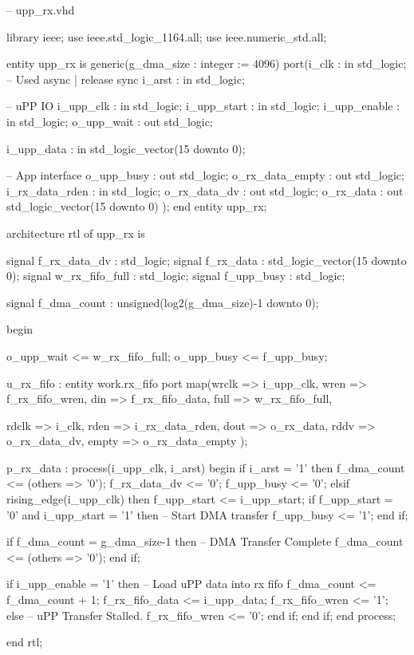 \begin{VHDLlisting}[tabsize=4]
-- upp_rx.vhd

library ieee;
	use ieee.std_logic_1164.all;
	use ieee.numeric_std.all;
	
entity upp_rx is
	generic(g_dma_size : integer := 4096)
	port(i_clk           : in    std_logic;
		 -- Used async | release sync
	     i_arst          : in    std_logic;
		 
		 -- uPP IO
		 i_upp_clk       : in    std_logic; 
		 i_upp_start     : in    std_logic;
		 i_upp_enable    : in    std_logic;
		 o_upp_wait      :   out std_logic;
		 
		 i_upp_data      : in    std_logic_vector(15 downto 0);
		 
		 -- App interface
		 o_upp_busy      :   out std_logic;
		 o_rx_data_empty :   out std_logic;
		 i_rx_data_rden  : in    std_logic;
		 o_rx_data_dv    :   out std_logic;
		 o_rx_data       :   out std_logic_vector(15 downto 0)	
	);
end entity upp_rx;


architecture rtl of upp_rx is
	
	signal f_rx_data_dv   : std_logic;
	signal f_rx_data      : std_logic_vector(15 downto 0);
	signal w_rx_fifo_full : std_logic;
	signal f_upp_busy     : std_logic;
	
	signal f_dma_count    : unsigned(log2(g_dma_size)-1 downto 0);
	
	
	
begin

	o_upp_wait <= w_rx_fifo_full;
	o_upp_busy <= f_upp_busy; 

	u_rx_fifo : entity work.rx_fifo
	port map(wrclk => i_upp_clk, 
			 wren  => f_rx_fifo_wren,
			 din   => f_rx_fifo_data,
			 full  => w_rx_fifo_full,
	
			 rdclk => i_clk,
			 rden  => i_rx_data_rden,
			 dout  => o_rx_data,
			 rddv  => o_rx_data_dv,
			 empty => o_rx_data_empty	
	);

	p_rx_data : process(i_upp_clk, i_arst)
	begin
		if i_arst = '1' then
			f_dma_count <= (others => '0');
			f_rx_data_dv <= '0';
			f_upp_busy <= '0';
		elsif rising_edge(i_upp_clk) then
			f_upp_start <= i_upp_start;
			if f_upp_start = '0' and i_upp_start = '1' then	
				-- Start DMA transfer
				f_upp_busy <= '1';
			end if;
			
			if f_dma_count = g_dma_size-1 then
				-- DMA Transfer Complete
				f_dma_count <= (others => '0');
			end if;
		
			if i_upp_enable = '1' then
				-- Load uPP data into rx fifo
				f_dma_count <= f_dma_count + 1;
				f_rx_fifo_data <= i_upp_data;
				f_rx_fifo_wren <= '1';
			else
				-- uPP Transfer Stalled.
				f_rx_fifo_wren <= '0';
			end if;
		end if;
	end process;

	
end rtl;
\end{VHDLlisting}








